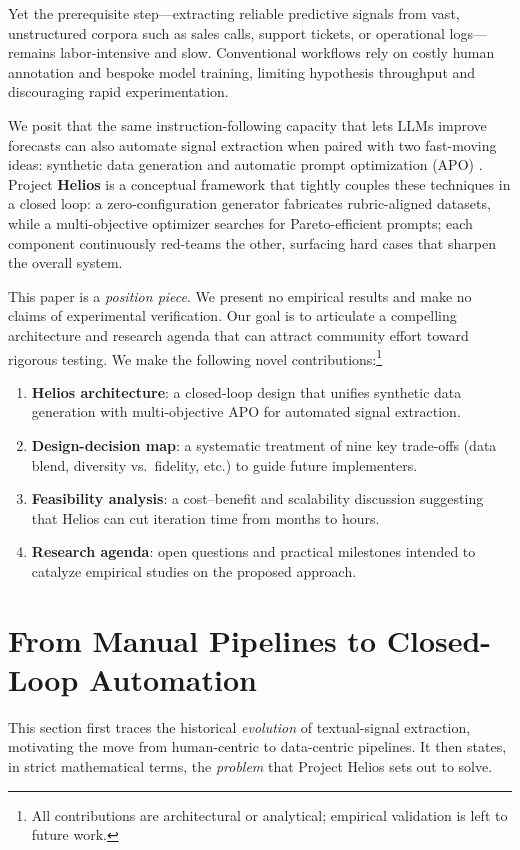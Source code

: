 \documentclass{article}
\begin{document}
Yet the prerequisite step—extracting reliable predictive signals from vast, unstructured corpora such as sales calls, support tickets, or operational logs—remains labor-intensive and slow.  Conventional workflows rely on costly human annotation and bespoke model training, limiting hypothesis throughput and discouraging rapid experimentation.

We posit that the same instruction-following capacity that lets LLMs improve forecasts can also automate signal extraction when paired with two fast-moving ideas: synthetic data generation \citep{patel2024datadreamertoolsyntheticdata, kowshik2024corrsynthcorrelatedsampling} and automatic prompt optimization (APO) \citep{yang2024largelanguagemodelsoptimizers, zhao2025pareto}.  Project \textbf{Helios} is a conceptual framework that tightly couples these techniques in a closed loop: a zero-configuration generator fabricates rubric-aligned datasets, while a multi-objective optimizer searches for Pareto-efficient prompts; each component continuously red-teams the other, surfacing hard cases that sharpen the overall system.

This paper is a \emph{position piece}.  We present no empirical results and make no claims of experimental verification.  Our goal is to articulate a compelling architecture and research agenda that can attract community effort toward rigorous testing. We make the following novel contributions:\footnote{All contributions are architectural or analytical; empirical validation is left to future work.}

\begin{enumerate}[leftmargin=*,noitemsep]
  \item \textbf{Helios architecture}: a closed-loop design that unifies synthetic data generation with multi-objective APO for automated signal extraction.
  \item \textbf{Design-decision map}: a systematic treatment of nine key trade-offs (data blend, diversity vs.\ fidelity, etc.) to guide future implementers.
  \item \textbf{Feasibility analysis}: a cost–benefit and scalability discussion suggesting that Helios can cut iteration time from months to hours.
  \item \textbf{Research agenda}: open questions and practical milestones intended to catalyze empirical studies on the proposed approach.
\end{enumerate}

\section{From Manual Pipelines to Closed-Loop Automation}
\label{sec:evolution}
This section first traces the historical \emph{evolution} of textual-signal extraction, motivating the move from human-centric to data-centric pipelines.  It then states, in strict mathematical terms, the \emph{problem} that Project Helios sets out to solve.
\end{document}
